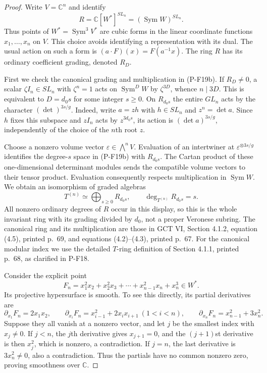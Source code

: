 \begin{proof}
Write $V=\mathbb C^n$ and identify
\[
 R=\mathbb C[W^*]^{SL_n}=(\operatorname{Sym}W)^{SL_n}.
 \tag{P-F19f}
\]
Thus points of $W^*=\operatorname{Sym}^3V^*$ are cubic forms in
the linear coordinate functions $x_1,\ldots,x_n$ on $V$.
This choice avoids identifying a representation with its dual.
The usual action on such a form is $(a\cdot F)(x)=F(a^{-1}x)$.
The ring $R$ has its ordinary coefficient grading, denoted $R_D$.

First we check the canonical grading and multiplication in (P-F19b).
If $R_D\ne0$, a scalar $\zeta I_n\in SL_n$ with $\zeta^n=1$
acts on $\operatorname{Sym}^D W$ by $\zeta^{3D}$, whence
$n\mid3D$. This is equivalent to $D=d_0s$ for some integer
$s\ge0$. On $R_{d_0s}$ the entire $GL_n$ acts by the character
$(\det)^{3s/g}$. Indeed, write $a=zh$ with $h\in SL_n$ and
$z^n=\det a$. Since $h$ fixes this subspace and $zI_n$ acts by
$z^{3d_0s}$, its action is $(\det a)^{3s/g}$, independently of
the choice of the $n$th root $z$.

Choose a nonzero volume vector $\varepsilon\in\bigwedge^nV$.
Evaluation of an intertwiner at $\varepsilon^{\otimes3s/g}$
identifies the degree-$s$ space in (P-F19b) with $R_{d_0s}$.
The Cartan product of these one-dimensional determinant modules
sends the compatible volume vectors to their tensor product.
Evaluation consequently respects multiplication in
$\operatorname{Sym}W$. We obtain an isomorphism of graded
algebras
\[
 T^{(n)}\simeq\bigoplus_{s\ge0}R_{d_0s},
 \qquad \deg_{T^{(n)}} R_{d_0s}=s.
 \tag{P-F19g}
\]
All nonzero ordinary degrees of $R$ occur in this display, so this
is the whole invariant ring with its grading divided by $d_0$,
not a proper Veronese subring. The canonical ring and its
multiplication are those in GCT VI, Section 4.1.2, equation (4.5),
printed p.~69, and equations (4.2)--(4.3), printed p.~67.
For the canonical modular index we use the detailed $T$-ring
definition of Section 4.1.1, printed p.~68, as clarified in P-F18.

Consider the explicit point
\[
 F_n=x_1^2x_2+x_2^2x_3+\cdots+x_{n-1}^2x_n+x_n^3
       \in W^*.
 \tag{P-F19h}
\]
Its projective hypersurface is smooth. To see this directly, its
partial derivatives are
\[
 \partial_{x_1}F_n=2x_1x_2,\qquad
 \partial_{x_i}F_n=x_{i-1}^2+2x_ix_{i+1}\ (1<i<n),\qquad
 \partial_{x_n}F_n=x_{n-1}^2+3x_n^2.
\]
Suppose they all vanish at a nonzero vector, and let $j$ be the
smallest index with $x_j\ne0$. If $j<n$, the $j$th derivative
gives $x_{j+1}=0$, and the $(j+1)$st derivative is then $x_j^2$,
which is nonzero, a contradiction. If $j=n$, the last derivative
is $3x_n^2\ne0$, also a contradiction. Thus the partials have
no common nonzero zero, proving smoothness over $\mathbb C$.


\end{proof}
